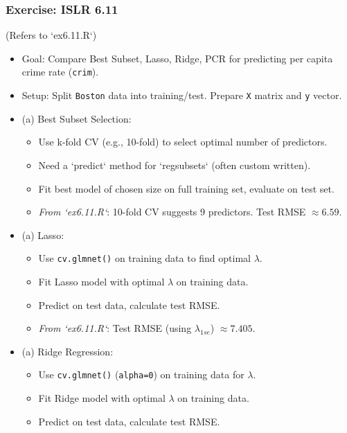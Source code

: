 \documentclass[12pt,a4paper]{article}
\newcommand{\Rfunction}[1]{\texttt{#1()}} %
\newcommand{\Robject}[1]{\texttt{#1}} %
\newcommand{\Rcode}[1]{\texttt{#1}} %
\begin{document}
\begin{itemize}
    \subsubsection{Exercise: ISLR 6.11 }
        (Refers to `ex6.11.R`)
        \begin{itemize}
            \item Goal: Compare Best Subset, Lasso, Ridge, PCR for predicting per capita crime rate (\Robject{crim}).
            \item Setup: Split \Robject{Boston} data into training/test. Prepare \Robject{X} matrix and \Robject{y} vector.
            \item (a) Best Subset Selection:
                \begin{itemize}
                    \item Use k-fold CV (e.g., 10-fold) to select optimal number of predictors.
                    \item Need a `predict` method for `regsubsets` (often custom written).
                    \item Fit best model of chosen size on full training set, evaluate on test set.
                    \item \textit{From `ex6.11.R`}: 10-fold CV suggests 9 predictors. Test RMSE $\approx 6.59$.
                \end{itemize}
            \item (a) Lasso:
                \begin{itemize}
                    \item Use \Rfunction{cv.glmnet} on training data to find optimal $\lambda$.
                    \item Fit Lasso model with optimal $\lambda$ on training data.
                    \item Predict on test data, calculate test RMSE.
                    \item \textit{From `ex6.11.R`}: Test RMSE (using $\lambda_{1se}$) $\approx 7.405$.
                \end{itemize}
            \item (a) Ridge Regression:
                \begin{itemize}
                    \item Use \Rfunction{cv.glmnet} (\Rcode{alpha=0}) on training data for $\lambda$.
                    \item Fit Ridge model with optimal $\lambda$ on training data.
                    \item Predict on test data, calculate test RMSE.

\end{itemize}
\end{itemize}
\end{itemize}
\end{document}
